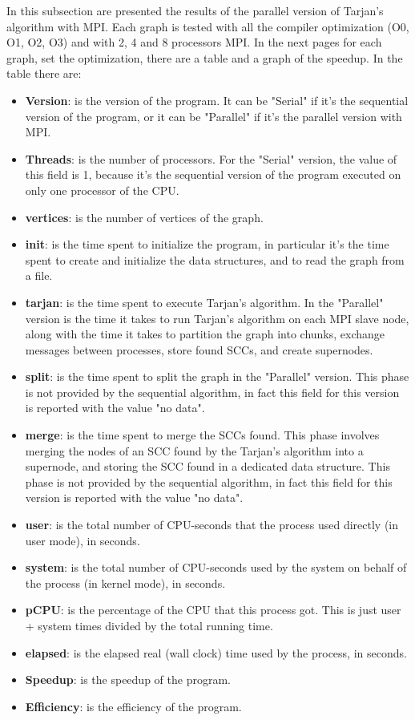 In this subsection are presented the results of the parallel version of Tarjan's algorithm with MPI.
Each graph is tested with all the compiler optimization (O0, O1, O2, O3) and with 2, 4 and 8 processors MPI.
In the next pages for each graph, set the optimization, there are a table and a graph of the speedup.
In the table there are:
\begin{itemize}
    \item \textbf{Version}: is the version of the program. It can be "Serial" if it's the sequential version of the program, or it can be "Parallel" if it's the parallel version with MPI.
    \item \textbf{Threads}: is the number of processors. For the "Serial" version, the value of this field is 1, because it's the sequential version of the program executed on only one processor of the CPU.
    \item \textbf{vertices}: is the number of vertices of the graph.
    \item \textbf{init}: is the time spent to initialize the program, in particular it's the time spent to create and initialize the data structures, and to read the graph from a file.
    \item \textbf{tarjan}: is the time spent to execute Tarjan's algorithm. In the "Parallel" version is the time it takes to run Tarjan's algorithm on each MPI slave node, along with the time it takes to partition the graph into chunks, exchange messages between processes, store found SCCs, and create supernodes.
    \item \textbf{split}: is the time spent to split the graph in the "Parallel" version. This phase is not provided by the sequential algorithm, in fact this field for this version is reported with the value "no data".
    \item \textbf{merge}: is the time spent to merge the SCCs found. This phase involves merging the nodes of an SCC found by the Tarjan's algorithm into a supernode, and storing the SCC found in a dedicated data structure.
    This phase is not provided by the sequential algorithm, in fact this field for this version is reported with the value "no data".
    \item \textbf{user}: is the total number of CPU-seconds that the process used directly (in user mode), in seconds.
    \item \textbf{system}: is the total number of CPU-seconds used by the system on behalf of the process (in kernel mode), in seconds.
    \item \textbf{pCPU}: is the percentage of the CPU that this process got. This is just user + system times divided by the total running time.
    \item \textbf{elapsed}: is the elapsed real (wall clock) time used by the process, in seconds.
    \item \textbf{Speedup}: is the speedup of the program.
    \item \textbf{Efficiency}: is the efficiency of the program. 
\end{itemize}
